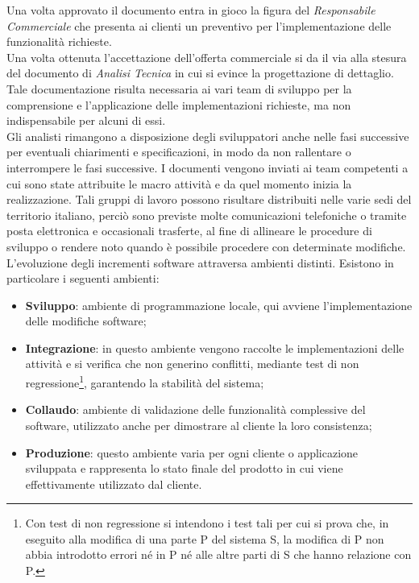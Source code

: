 	Una volta approvato il documento entra in gioco la figura del \textit{Responsabile Commerciale} che presenta ai clienti un preventivo per l'implementazione delle funzionalità richieste.\\ %
	
	Una volta ottenuta l'accettazione dell'offerta commerciale si da il via alla stesura del documento di \textit{Analisi Tecnica} in cui si evince la progettazione di dettaglio. Tale documentazione risulta necessaria ai vari team di sviluppo per la comprensione e l'applicazione delle implementazioni richieste, ma non indispensabile per alcuni di essi.\\
		
	Gli analisti rimangono a disposizione degli sviluppatori anche nelle fasi successive per eventuali chiarimenti e specificazioni, in modo da non rallentare o interrompere le fasi successive. I documenti vengono inviati ai team competenti a cui sono state attribuite le macro attività e da quel momento inizia la realizzazione. Tali gruppi di lavoro possono risultare distribuiti nelle varie sedi del territorio italiano, perciò sono previste molte comunicazioni telefoniche o tramite posta elettronica e occasionali trasferte, al fine di allineare le procedure di sviluppo o rendere noto quando è possibile procedere con determinate modifiche. \\
	
	L'evoluzione degli incrementi software attraversa ambienti distinti. Esistono in particolare i seguenti ambienti:
	\begin{itemize}
		\item \textbf{Sviluppo}: ambiente di programmazione locale, qui avviene l'implementazione delle modifiche software;
		\item \textbf{Integrazione}: in questo ambiente vengono raccolte le implementazioni delle attività e si verifica che non generino conflitti, mediante test di non regressione\footnote{Con test di non regressione si intendono i test tali per cui si prova che, in eseguito alla modifica di una parte P del sistema S, la modifica di P non abbia introdotto errori né in P né alle altre parti di S che hanno relazione con P.}, garantendo la stabilità del sistema;
		\item \textbf{Collaudo}: ambiente di validazione delle funzionalità complessive del software, utilizzato anche per dimostrare al cliente la loro consistenza;
		\item \textbf{Produzione}: questo ambiente varia per ogni cliente o applicazione sviluppata e rappresenta lo stato finale del prodotto in cui viene effettivamente utilizzato dal cliente.
	\end{itemize}	
	
